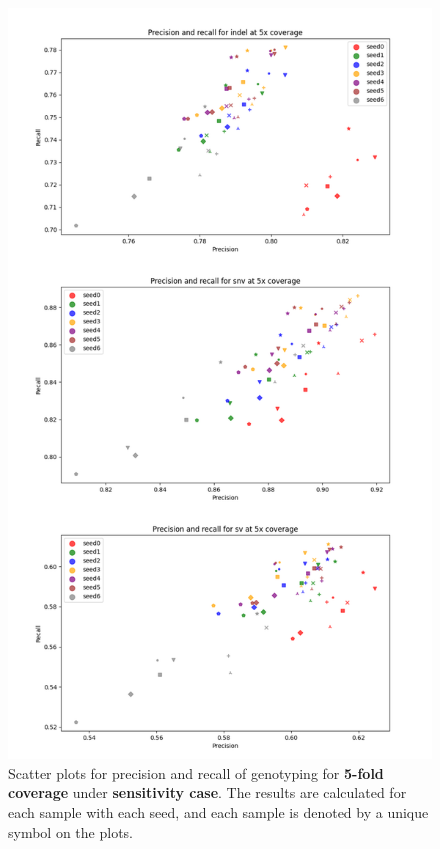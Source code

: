 \documentclass{PHlab-thesis}
\begin{document}
\begin{figure}[ht!]
	\centering
	\includegraphics[scale=0.5]{figures/Sensitivity_genotyping_5x.png}
	\caption{Scatter plots for precision and recall of genotyping for \textbf{5-fold coverage} under \textbf{sensitivity case}. The results are calculated for each sample with each seed, and each sample is denoted by a unique symbol on the plots.}
	\label{fig:sensitivity_genotyping_5x} %
\end{figure}
\end{document}
